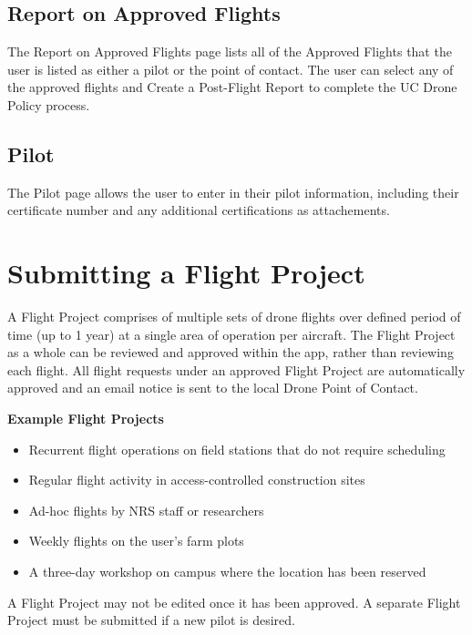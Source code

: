 \documentclass[
  12pt,
]{book}
\providecommand{\tightlist}{%
  \setlength{\itemsep}{0pt}\setlength{\parskip}{0pt}}
\begin{document}
\hypertarget{report-on-approved-flights}{%
\subsection{Report on Approved Flights}\label{report-on-approved-flights}}

The Report on Approved Flights page lists all of the Approved Flights that the user is listed as either a pilot or the point of contact. The user can select any of the approved flights and Create a Post-Flight Report to complete the UC Drone Policy process.

\hypertarget{pilot}{%
\subsection{Pilot}\label{pilot}}

The Pilot page allows the user to enter in their pilot information, including their certificate number and any additional certifications as attachements.

\hypertarget{UCDrones-project}{%
\section{Submitting a Flight Project}\label{UCDrones-project}}

A Flight Project comprises of multiple sets of drone flights over defined period of time (up to 1 year) at a single area of operation per aircraft. The Flight Project as a whole can be reviewed and approved within the app, rather than reviewing each flight. All flight requests under an approved Flight Project are automatically approved and an email notice is sent to the local Drone Point of Contact.

\textbf{Example Flight Projects}

\begin{itemize}
\tightlist
\item
  Recurrent flight operations on field stations that do not require scheduling
\item
  Regular flight activity in access-controlled construction sites
\item
  Ad-hoc flights by NRS staff or researchers
\item
  Weekly flights on the user's farm plots
\item
  A three-day workshop on campus where the location has been reserved
\end{itemize}

A Flight Project may not be edited once it has been approved. A separate Flight Project must be submitted if a new pilot is desired.
\end{document}
